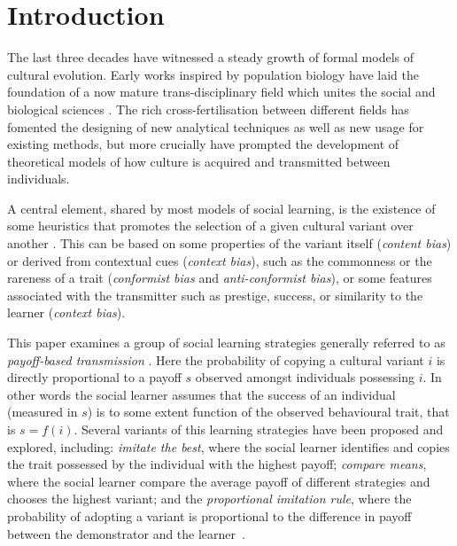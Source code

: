 \documentclass[review,authoryear]{elsarticle}
\begin{document}
\section{Introduction}

The last three decades have witnessed a steady growth of formal models of cultural evolution. Early works inspired by population biology \citep{cavallisforza_feldman_1981,boyd1985} have laid the foundation of a now mature trans-disciplinary field which unites the social and biological sciences \citep{mesoudi_etal_2006}. The rich cross-fertilisation between different fields has fomented the designing of new analytical techniques as well as new usage for existing methods, but more crucially have prompted the development of theoretical models of how culture is acquired and transmitted between individuals. %

A central element, shared by most models of social learning, is the existence of some heuristics that promotes the selection of a given cultural variant over another \citep{laland2004}. This can be based on some properties of the variant itself (\emph{content bias}) or derived from contextual cues (\emph{context bias}), such as the commonness or the rareness of a trait (\emph{conformist bias} and \emph{anti-conformist bias}), or some features associated with the transmitter such as prestige, success, or similarity to the learner (\emph{context bias})\citep{henrich_mcelreath2003}. 

This paper examines a group of social learning strategies generally referred to as \emph{payoff-based transmission} \citep{schlag1998,kendal_etal_2009,lake_and_crema_2012,baldini2013,kandler_and_laland_2013,crema_lake_inpress}. Here the probability of copying a cultural variant $i$ is directly proportional to a payoff $s$ observed amongst individuals possessing $i$. In other words the social learner assumes that the success of an individual (measured in $s$) is to some extent function of the observed behavioural trait, that is $s=f(i)$. Several variants of this learning strategies have been proposed and explored, including: \emph{imitate the best}, where the social learner identifies and copies the trait possessed by the individual with the highest payoff; \emph{compare means}, where the social learner compare the average payoff of different strategies and chooses the highest variant; and the \emph{proportional imitation rule}, where the probability of adopting a variant is proportional to the difference in payoff between the demonstrator and the learner~\citep{schlag1998,baldini2013}. 
\end{document}
